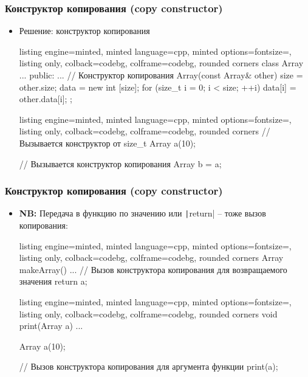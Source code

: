 \documentclass[10pt]{beamer}
\begin{document}
\begin{frame}[fragile]
\frametitle{Конструктор копирования (copy constructor)}
\begin{itemize}
\item Решение: конструктор копирования
\begin{tcblisting}{listing engine=minted, minted language=cpp, minted options={fontsize=\scriptsize}, listing only, colback=codebg, colframe=codebg, rounded corners}
class Array {
  ...
public:
  ...
  // Конструктор копирования
  Array(const Array& other) {
    size = other.size;
    data = new int [size];
    for (size_t i = 0; i < size; ++i)
      data[i] = other.data[i];
  }
};
\end{tcblisting}
\pause
\begin{tcblisting}{listing engine=minted, minted language=cpp, minted options={fontsize=\scriptsize}, listing only, colback=codebg, colframe=codebg, rounded corners}
// Вызывается конструктор от size_t
Array a(10);

// Вызывается конструктор копирования
Array b = a;
\end{tcblisting}
\end{itemize}
\end{frame}

\begin{frame}[fragile]
\frametitle{Конструктор копирования (copy constructor)}
\begin{itemize}
\item \textbf{NB:} Передача в функцию по значению или \texttt|return| -- тоже вызов копирования:
\begin{tcblisting}{listing engine=minted, minted language=cpp, minted options={fontsize=\scriptsize}, listing only, colback=codebg, colframe=codebg, rounded corners}
Array makeArray() {
  ...
  // Вызов конструктора копирования для возвращаемого значения
  return a;
}
\end{tcblisting}
\pause
\begin{tcblisting}{listing engine=minted, minted language=cpp, minted options={fontsize=\scriptsize}, listing only, colback=codebg, colframe=codebg, rounded corners}
void print(Array a) {
  ...
}

Array a(10);

// Вызов конструктора копирования для аргумента функции
print(a);
\end{tcblisting}
\end{itemize}
\end{frame}
\end{document}
